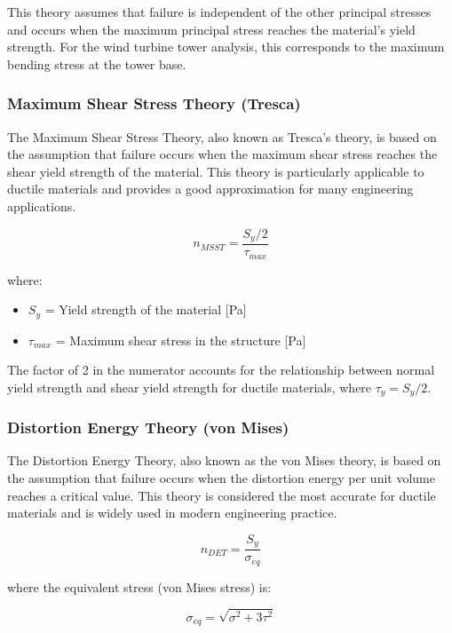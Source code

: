 \documentclass[12pt]{article}
\begin{document}
This theory assumes that failure is independent of the other principal stresses and occurs when the maximum principal stress reaches the material's yield strength. For the wind turbine tower analysis, this corresponds to the maximum bending stress at the tower base.

\subsubsection{Maximum Shear Stress Theory (Tresca)}

The Maximum Shear Stress Theory, also known as Tresca's theory, is based on the assumption that failure occurs when the maximum shear stress reaches the shear yield strength of the material. This theory is particularly applicable to ductile materials and provides a good approximation for many engineering applications.

\begin{equation}
n_{MSST} = \frac{S_y/2}{\tau_{max}}
\end{equation}

where:
\begin{itemize}
    \item $S_y$ = Yield strength of the material [Pa]
    \item $\tau_{max}$ = Maximum shear stress in the structure [Pa]
\end{itemize}

The factor of 2 in the numerator accounts for the relationship between normal yield strength and shear yield strength for ductile materials, where $\tau_y = S_y/2$.

\subsubsection{Distortion Energy Theory (von Mises)}

The Distortion Energy Theory, also known as the von Mises theory, is based on the assumption that failure occurs when the distortion energy per unit volume reaches a critical value. This theory is considered the most accurate for ductile materials and is widely used in modern engineering practice.

\begin{equation}
n_{DET} = \frac{S_y}{\sigma_{eq}}
\end{equation}

where the equivalent stress (von Mises stress) is:

\begin{equation}
\sigma_{eq} = \sqrt{\sigma^2 + 3\tau^2}
\end{equation}
\end{document}
